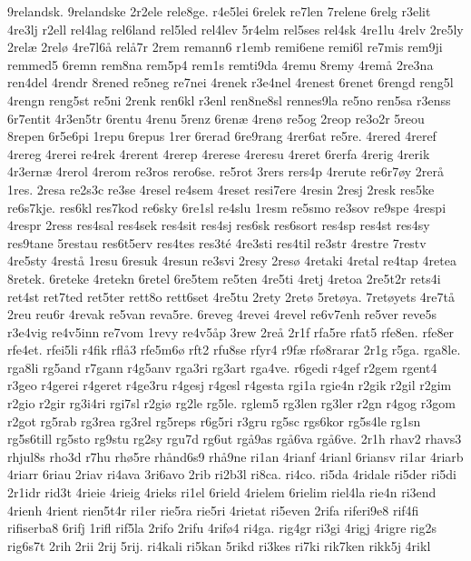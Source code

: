 9relandsk.
9relandske
2r2ele
rele8ge.
r4e5lei
6relek
re7len
7relene
6relg
r3elit
4re3lj
r2ell
rel4lag
rel6land
rel5led
rel4lev
5r4elm
rel5ses
rel4sk
4re1lu
4relv
2re5ly
2rel^^e6
2rel^^f8
4re7l6^^e5
rel^^e57r
2rem
remann6
r1emb
remi6ene
remi6l
re7mis
rem9ji
remmed5
6remn
rem8na
rem5p4
rem1s
remti9da
4remu
8remy
4rem^^e5
2re3na
ren4del
4rendr
8rened
re5neg
re7nei
4renek
r3e4nel
4renest
6renet
6rengd
reng5l
4rengn
reng5st
re5ni
2renk
ren6kl
r3enl
ren8ne8sl
rennes9la
re5no
ren5sa
r3enss
6r7entit
4r3en5tr
6rentu
4renu
5renz
6ren^^e6
4ren^^f8
re5og
2reop
re3o2r
5reou
8repen
6r5e6pi
1repu
6repus
1rer
6rerad
6re9rang
4rer6at
re5re.
4rered
4reref
4rereg
4rerei
re4rek
4rerent
4rerep
4rerese
4reresu
4reret
6rerfa
4rerig
4rerik
4r3ern^^e6
4rerol
4rerom
re3ros
rero6se.
re5rot
3rers
rers4p
4rerute
re6r7^^f8y
2rer^^e5
1res.
2resa
re2s3c
re3se
4resel
re4sem
4reset
resi7ere
4resin
2resj
2resk
res5ke
re6s7kje.
res6kl
res7kod
re6sky
6re1sl
re4slu
1resm
re5smo
re3sov
re9spe
4respi
4respr
2ress
res4sal
res4sek
res4sit
res4sj
res6sk
res6sort
res4sp
res4st
res4sy
res9tane
5restau
res6t5erv
res4tes
res3t^^e9
4re3sti
res4til
re3str
4restre
7restv
4re5sty
4rest^^e5
1resu
6resuk
4resun
re3svi
2resy
2res^^f8
4retaki
4retal
re4tap
4retea
8retek.
6reteke
4retekn
6retel
6re5tem
re5ten
4re5ti
4retj
4retoa
2re5t2r
rets4i
ret4st
ret7ted
ret5ter
rett8o
rett6set
4re5tu
2rety
2ret^^f8
5ret^^f8ya.
7ret^^f8yets
4re7t^^e5
2reu
reu6r
4revak
re5van
reva5re.
6reveg
4revei
4revel
re6v7enh
re5ver
reve5s
r3e4vig
re4v5inn
re7vom
1revy
re4v5^^e5p
3rew
2re^^e5
2r1f
rfa5re
rfat5
rfe8en.
rfe8er
rfe4et.
rfei5li
r4fik
rfl^^e53
rfe5m6^^f8
rft2
rfu8se
rfyr4
r9f^^e6
rf^^f88rarar
2r1g
r5ga.
rga8le.
rga8li
rg5and
r7gann
r4g5anv
rga3ri
rg3art
rga4ve.
r6gedi
r4gef
r2gem
rgent4
r3geo
r4gerei
r4geret
r4ge3ru
r4gesj
r4gesl
r4gesta
rgi1a
rgie4n
r2gik
r2gil
r2gim
r2gio
r2gir
rg3i4ri
rgi7sl
r2gi^^f8
rg2le
rg5le.
rglem5
rg3len
rg3ler
r2gn
r4gog
r3gom
r2got
rg5rab
rg3rea
rg3rel
rg5reps
r6g5ri
r3gru
rg5sc
rgs6kor
rg5s4le
rg1sn
rg5s6till
rg5sto
rg9stu
rg2sy
rgu7d
rg6ut
rg^^e59as
rg^^e56va
rg^^e56ve.
2r1h
rhav2
rhavs3
rhjul8s
rho3d
r7hu
rh^^f85re
rh^^e5nd6s9
rh^^e59ne
ri1an
4rianf
4rianl
6riansv
ri1ar
4riarb
4riarr
6riau
2riav
ri4ava
3ri6avo
2rib
ri2b3l
ri8ca.
ri4co.
ri5da
4ridale
ri5der
ri5di
2r1idr
rid3t
4rieie
4rieig
4rieks
ri1el
6rield
4rielem
6rielim
riel4la
rie4n
ri3end
4rienh
4rient
rien5t4r
ri1er
rie5ra
rie5ri
4rietat
ri5even
2rifa
riferi9e8
rif4fi
rifiserba8
6rifj
1rifl
rif5la
2rifo
2rifu
4rif^^f84
ri4ga.
rig4gr
ri3gi
4rigj
4rigre
rig2s
rig6s7t
2rih
2rii
2rij
5rij.
ri4kali
ri5kan
5rikd
ri3kes
ri7ki
rik7ken
rikk5j
4rikl
